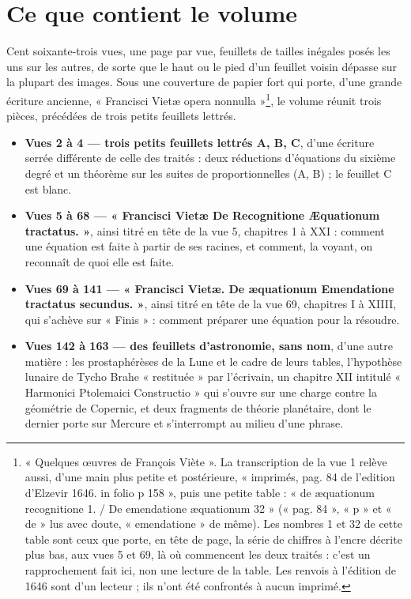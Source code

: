 \documentclass[11pt,a4paper]{article}
\begin{document}
\section*{Ce que contient le volume}

Cent soixante-trois vues, une page par vue, feuillets de tailles inégales posés
les uns sur les autres, de sorte que le haut ou le pied d'un feuillet voisin
dépasse sur la plupart des images. Sous une couverture de papier fort qui porte,
d'une grande écriture ancienne, « Francisci Vietæ opera nonnulla »\footnote{« Quelques
œuvres de François Viète ». La transcription de la vue 1 relève aussi, d'une
main plus petite et postérieure, « imprimés, pag. 84 de l'edition d'Elzevir
1646. in folio p 158 », puis une petite table : « de æquationum recognitione 1. /
De emendatione æquationum 32 » (« pag. 84 », « p » et « de » lus avec doute,
« emendatione » de même). Les nombres 1 et 32 de cette table sont ceux que
porte, en tête de page, la série de chiffres à l'encre décrite plus bas, aux
vues 5 et 69, là où commencent les deux traités : c'est un rapprochement fait
ici, non une lecture de la table. Les renvois à l'édition de 1646 sont d'un
lecteur ; ils n'ont été confrontés à aucun imprimé.}, le volume réunit trois
pièces, précédées de trois petits feuillets lettrés.

\begin{itemize}
  \item \textbf{Vues 2 à 4 — trois petits feuillets lettrés A, B, C}, d'une
    écriture serrée différente de celle des traités : deux réductions
    d'équations du sixième degré et un théorème sur les suites de
    proportionnelles (A, B) ; le feuillet C est blanc.
  \item \textbf{Vues 5 à 68 — « Francisci Vietæ De Recognitione Æquationum
    tractatus. »}, ainsi titré en tête de la vue 5, chapitres 1 à XXI : comment
    une équation est faite à partir de ses racines, et comment, la voyant, on
    reconnaît de quoi elle est faite.
  \item \textbf{Vues 69 à 141 — « Francisci Vietæ. De æquationum Emendatione
    tractatus secundus. »}, ainsi titré en tête de la vue 69, chapitres I à
    XIIII, qui s'achève sur « Finis » : comment préparer une équation pour la
    résoudre.
  \item \textbf{Vues 142 à 163 — des feuillets d'astronomie, sans nom}, d'une
    autre matière : les prostaphérèses de la Lune et le cadre de leurs tables,
    l'hypothèse lunaire de Tycho Brahe « restituée » par l'écrivain, un
    chapitre XII intitulé « Harmonici Ptolemaici Constructio » qui s'ouvre sur
    une charge contre la géométrie de Copernic, et deux fragments de théorie
    planétaire, dont le dernier porte sur Mercure et s'interrompt au milieu
    d'une phrase.
\end{itemize}
\end{document}
